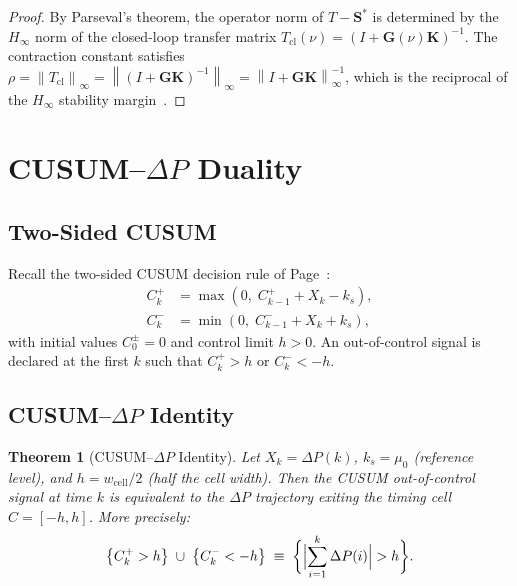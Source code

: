\documentclass[10pt,twocolumn]{article}
\theoremstyle{plain}
\newtheorem{theorem}{Theorem}[section]
\theoremstyle{definition}
\theoremstyle{remark}
\newcommand{\norm}[1]{\left\|#1\right\|}
\newcommand{\DeltaP}{\Delta P}
\newcommand{\Sstar}{\mathbf{S}^{*}}
\begin{document}
\begin{proof}
By Parseval's theorem, the operator norm of $T - \Sstar$ is determined
by the $H_\infty$ norm of the closed-loop transfer matrix
$T_{\mathrm{cl}}(\nu) = (I + \mathbf{G}(\nu)\mathbf{K})^{-1}$.
The contraction constant satisfies
$\rho = \norm{T_{\mathrm{cl}}}_\infty
= \norm{(I+\mathbf{G}\mathbf{K})^{-1}}_\infty
= \norm{I+\mathbf{G}\mathbf{K}}_\infty^{-1}$,
which is the reciprocal of the $H_\infty$ stability margin~\cite{Astrom2008}.
\end{proof}

\section{CUSUM--$\DeltaP$ Duality}
\label{sec:cusum}

\subsection{Two-Sided CUSUM}
\label{ssec:cusum}

Recall the two-sided CUSUM decision rule of Page~\cite{Page1954}:
\begin{align}
  C_k^+ &= \max\!\left(0,\; C_{k-1}^+ + X_k - k_s\right),
  \label{eq:cusum_plus}\\
  C_k^- &= \min\!\left(0,\; C_{k-1}^- + X_k + k_s\right),
  \label{eq:cusum_minus}
\end{align}
with initial values $C_0^\pm = 0$ and control limit $h > 0$.
An out-of-control signal is declared at the first $k$ such that
$C_k^+ > h$ or $C_k^- < -h$.

\subsection{CUSUM--$\DeltaP$ Identity}
\label{ssec:cdi}

\begin{theorem}[CUSUM--$\DeltaP$ Identity]
\label{thm:cusum}
Let $X_k = \DeltaP(k)$, $k_s = \mu_0$ (reference level), and
$h = w_{\mathrm{cell}}/2$ (half the cell width).  Then the CUSUM
out-of-control signal at time $k$ is equivalent to the $\DeltaP$
trajectory exiting the timing cell $C = [-h, h]$.  More precisely:
\begin{equation}
  \bigl\{C_k^+ > h\bigr\} \;\cup\; \bigl\{C_k^- < -h\bigr\}
  \;\equiv\;
  \biggl\{\Bigl|\sum_{i=1}^k \DeltaP(i)\Bigr| > h\biggr\}.
  \label{eq:cusum_ident}
\end{equation}
\end{theorem}
\end{document}
